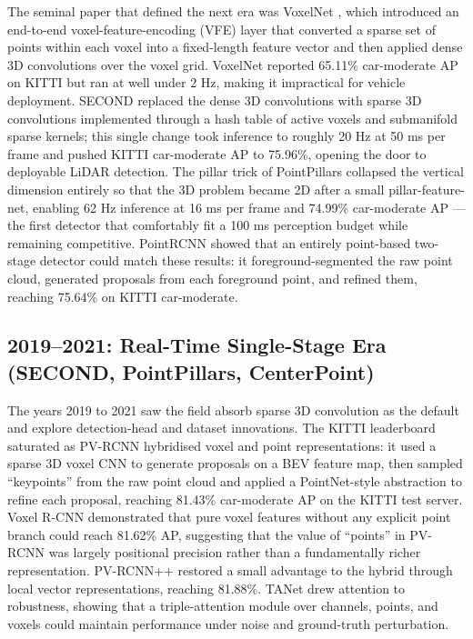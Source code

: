 \documentclass{article}
\begin{document}
The seminal paper that defined the next era was VoxelNet \citep{zhou2017voxelnetendtoendle}, which introduced an end-to-end voxel-feature-encoding (VFE) layer that converted a sparse set of points within each voxel into a fixed-length feature vector and then applied dense 3D convolutions over the voxel grid. VoxelNet reported 65.11\% car-moderate AP on KITTI but ran at well under 2 Hz, making it impractical for vehicle deployment. SECOND \citep{yan2018secondsparselyembe} replaced the dense 3D convolutions with sparse 3D convolutions implemented through a hash table of active voxels and submanifold sparse kernels; this single change took inference to roughly 20 Hz at 50 ms per frame and pushed KITTI car-moderate AP to 75.96\%, opening the door to deployable LiDAR detection. The pillar trick of PointPillars \citep{lang2019pointpillarsfasten} collapsed the vertical dimension entirely so that the 3D problem became 2D after a small pillar-feature-net, enabling 62 Hz inference at 16 ms per frame and 74.99\% car-moderate AP --- the first detector that comfortably fit a 100 ms perception budget while remaining competitive. PointRCNN \citep{shi2019pointrcnn3dobjectp} showed that an entirely point-based two-stage detector could match these results: it foreground-segmented the raw point cloud, generated proposals from each foreground point, and refined them, reaching 75.64\% on KITTI car-moderate.

\subsection{2019--2021: Real-Time Single-Stage Era (SECOND, PointPillars, CenterPoint)}\label{real-time-single-stage-era-second-pointpillars-centerpoint}

The years 2019 to 2021 saw the field absorb sparse 3D convolution as the default and explore detection-head and dataset innovations. The KITTI leaderboard saturated as PV-RCNN \citep{shi2019pointrcnn3dobjectp} hybridised voxel and point representations: it used a sparse 3D voxel CNN to generate proposals on a BEV feature map, then sampled ``keypoints'' from the raw point cloud and applied a PointNet-style abstraction to refine each proposal, reaching 81.43\% car-moderate AP on the KITTI test server. Voxel R-CNN \citep{deng2021voxelrcnntowardshi} demonstrated that pure voxel features without any explicit point branch could reach 81.62\% AP, suggesting that the value of ``points'' in PV-RCNN was largely positional precision rather than a fundamentally richer representation. PV-RCNN++ \citep{shi2022pvrcnnpointvoxelfe} restored a small advantage to the hybrid through local vector representations, reaching 81.88\%. TANet \citep{liu2020tanetrobust3dobjec} drew attention to robustness, showing that a triple-attention module over channels, points, and voxels could maintain performance under noise and ground-truth perturbation.
\end{document}
